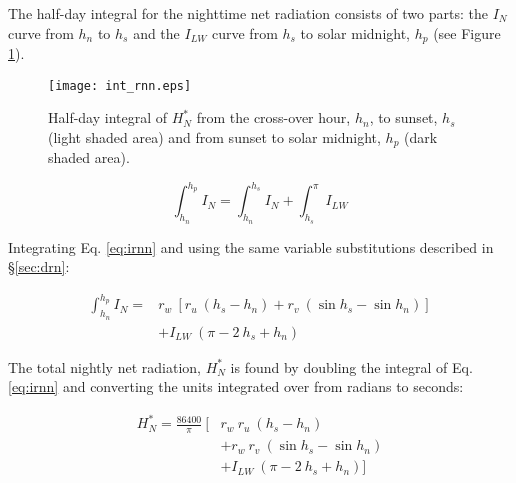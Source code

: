 The half-day integral for the nighttime net radiation consists of two parts: the $I_N$ curve from $h_n$ to $h_s$ and the $I_{LW}$ curve from $h_s$ to solar midnight, $h_p$ (see Figure \ref{fig:intrnn}).

\begin{figure}[ht!]
    \texttt{[image: int\_rnn.eps]}
    \caption{Half-day integral of $H_N^{\ast}$ from the cross-over hour, $h_n$, to sunset, $h_s$ (light shaded area) and from sunset to solar midnight, $h_p$ (dark shaded area).}
    \label{fig:intrnn}
\end{figure}

\begin{equation}
\label{eq:irnn}
	\int_{h_n}^{h_p} I_N = \int_{h_n}^{h_s} I_N + \int_{h_s}^{\pi} I_{LW}
\end{equation}

\noindent Integrating Eq. \ref{eq:irnn} and using the same variable substitutions described in \S \ref{sec:drn}:

\begin{equation}
\label{eq:intrnn}
	\begin{split}
		\int_{h_n}^{h_p} I_N = & r_w\: \left[ r_u\: (h_s - h_n) + 
		r_v\: (\sin h_s - \sin h_n) \right] \\
		& + I_{LW}\: \left(\pi- 2\: h_s + h_n \right)
	\end{split}
\end{equation}

\noindent The total nightly net radiation, $H_N^{\ast}$ is found by doubling the integral of Eq. \ref{eq:irnn} and converting the units integrated over from radians to seconds:

\begin{equation}
\label{eq:dayrnn}
	\begin{split}
		H_N^{\ast} = \frac{86400}{\pi}\: [ & r_w\: r_u\: (h_s - h_n) \\
		                       & + r_w\: r_v\: (\sin h_s - \sin h_n) \\
	                  & + I_{LW}\: \left(\pi - 2\: h_s  + h_n \right) ]
	\end{split}
\end{equation}

